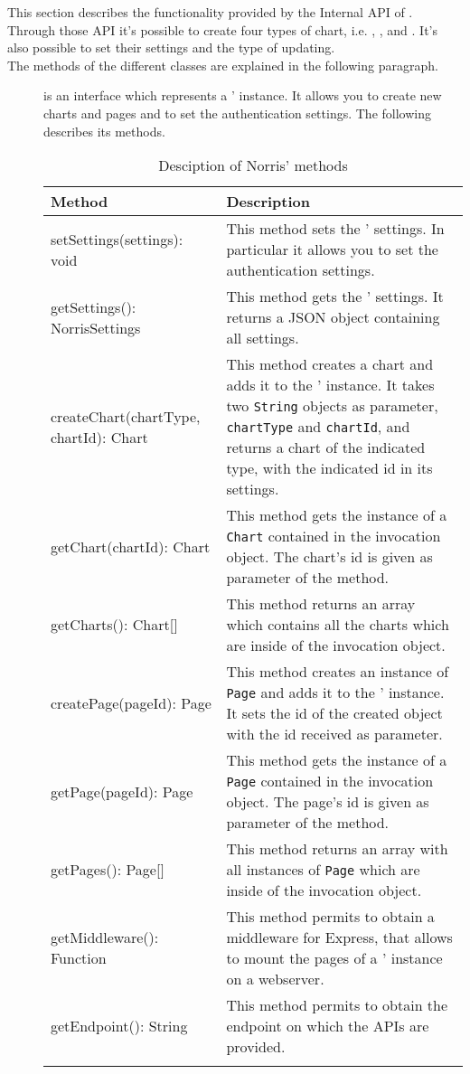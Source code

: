  \label{sec:InternalAPI}
	This section describes the functionality provided by the Internal API of . Through those API it's possible to create four types of chart, i.e. , ,  and . It's also possible to set their settings and the type of updating.\\ The methods of the different classes are explained in the following paragraph.
	\begin{description}
		\item[] is an interface which represents a ' instance. It allows you to create new charts and pages and to set the authentication settings. The following  describes its methods.
		\begin{longtabu}{| X | X |}

			\hline
			\rowfont{\bf}
			Method &
			Description \\
			\hline \endhead
			setSettings(settings): void & This method sets the ' settings. In particular it allows you to set the authentication settings.
			\\ \hline
			getSettings(): NorrisSettings & This method gets the ' settings. It returns a JSON object containing all settings. 
			\\ \hline
			createChart(chartType, chartId): Chart & This method creates a chart and adds it to the ' instance. It takes two \texttt{String} objects as parameter, \texttt{chartType} and \texttt{chartId}, and returns a chart of the indicated type, with the indicated id in its settings.
			\\ \hline
			getChart(chartId): Chart & This method gets the instance of a \texttt{Chart} contained in the invocation object. The chart's id is given as parameter of the method.
			\\ \hline
			getCharts(): Chart[] & This method returns an array which contains all the charts which are inside of the invocation object.
			\\ \hline
			createPage(pageId): Page & This method creates an instance of \texttt{Page} and adds it to the ' instance. It sets the id of the created object with the id received as parameter.\\ \hline
			getPage(pageId): Page & This method gets the instance of a \texttt{Page} contained in the invocation object. The page's id is given as parameter of the method.
			\\ \hline
			getPages(): Page[] & This method returns an array with all instances of \texttt{Page} which are inside of the invocation object.
			\\ \hline
			getMiddleware(): Function & This method permits to obtain a middleware for Express, that allows to mount the pages of a ' instance on a webserver.
			\\ \hline
			getEndpoint(): String & This method permits to obtain the endpoint on which the APIs are provided.
			\\ \hline
			\caption{Desciption of Norris' methods}
		\end{longtabu}
			

\end{description}
